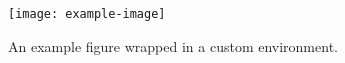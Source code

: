 \documentclass{article}
\newenvironment{myfigure}[1][htbp]
  {%
   \begin{figure}[#1]
   \centering %
  }
  {%
   \end{figure}
  }
\begin{document}
\lipsum[1][1-4] %

\begin{myfigure}
  \texttt{[image: example-image]} %
  \caption{An example figure wrapped in a custom environment.}
  \label{fig:mycustomfigure}
\end{myfigure}

\lipsum[2][1-4] %
\end{document}
